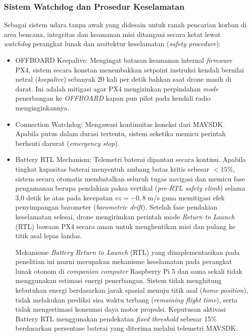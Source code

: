 \subsubsection{Sistem Watchdog dan Prosedur Keselamatan}
Sebagai sistem udara tanpa awak yang didesain untuk ranah pencarian korban di area bencana, integritas dan keamanan misi ditangani secara ketat lewat \textit{watchdog} perangkat lunak dan arsitektur keselamatan (\textit{safety procedure}):
\begin{itemize}
	\item OFFBOARD Keepalive: Mengingat batasan keamanan internal \textit{firmware} PX4, sistem secara konstan menembakkan setpoint instruksi kendali bernilai netral (\textit{keepalive}) sebanyak 20 kali per detik bahkan saat drone masih di darat. Ini adalah mitigasi agar PX4 mengizinkan perpindahan \textit{mode} penerbangan ke \textit{OFFBOARD} kapan pun pilot pada kendali radio menginginkannya.
	\item Connection Watchdog: Mengawasi kontinuitas koneksi dari MAVSDK. Apabila putus dalam durasi tertentu, sistem seketika memicu perintah berhenti darurat (\textit{emergency stop}).
	\item Battery RTL Mechanism: Telemetri baterai dipantau secara kontinu. Apabila tingkat kapasitas baterai menyentuh ambang batas kritis sebesar $< 15\%$, sistem secara otomatis membatalkan seluruh tugas navigasi dan memicu fase pengamanan berupa pendakian paksa vertikal (\textit{pre-RTL safety climb}) selama 3,0 detik ke atas pada kecepatan $vz = -0,8$ m/s guna memitigasi efek penyimpangan barometer (\textit{barometric drift}). Setelah fase pendakian keselamatan selesai, drone mengirimkan perintah mode \textit{Return to Launch} (RTL) bawaan PX4 secara aman untuk menghentikan misi dan pulang ke titik asal lepas landas.

	Mekanisme \textit{Battery Return to Launch} (RTL) yang diimplementasikan pada penelitian ini murni merupakan mekanisme keselamatan pada perangkat lunak otonom di \textit{companion computer} Raspberry Pi 5 dan sama sekali tidak menggunakan estimasi energi penerbangan. Sistem tidak menghitung kebutuhan energi berdasarkan jarak spasial menuju titik asal (\textit{home position}), tidak melakukan prediksi sisa waktu terbang (\textit{remaining flight time}), serta tidak mengestimasi konsumsi daya motor propulsi. Keputusan aktivasi Battery RTL menggunakan pendekatan \textit{fixed threshold} sebesar 15\% berdasarkan persentase baterai yang diterima melalui telemetri MAVSDK.


\end{itemize}
